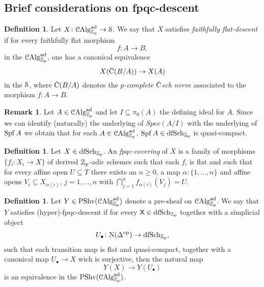 \documentclass[10pt,a4paper]{amsart}
\numberwithin{equation}{subsection}
\theoremstyle{definition}
\newtheorem{remark}[theorem]{Remark}
\newtheorem{definition}[theorem]{Definition}
\begin{document}

\subsection{Brief considerations on fpqc-descent} 

\begin{definition}
    Let $X \colon \mathcal C \mathrm{Alg}^{\mathrm{ad}}_{\mathbb Z_p} \to \mathcal S$. We say that $X$ satisfies \emph{faithfully flat-descent} if for every faithfully flat morphism
        \[
           f \colon  A \to B  ,
        \]
    in the \infcat $\mathcal C \mathrm{Alg}^{\mathrm{ad}}_{\mathbb Z_p}$, one has a canonical equivalence
        \[
            X(\vC(B/A)) \to  X(A) 
        \]
    in the \infcat $\mathcal S$, where $\vC(B/A)$ denotes the \emph{$p$-complete $\vC$ech nerve} associated to the morphism $f \colon A \to B$.
\end{definition}

\begin{remark}
    Let $A \in \mathcal C \mathrm{Alg}^{\mathrm{ad}}_{\mathbb Z_p}$ and let $I \subseteq \pi_0(A)$ the defining ideal for $A$. Since we can identify (naturally) the underlying \inftopos of $Spec (A/I)$
    with the underlying \inftopos of $\operatorname{Spf} A$ we obtain that for each $A \in \mathcal C \mathrm{Alg}^{\mathrm{ad}}_{\mathbb Z_p}$, $\operatorname{Spf} A \in \mathrm{dfSch}_{\mathbb Z_p}$ is quasi-compact.
\end{remark}

\begin{definition}
    Let $X \in \mathrm{dfSch}_{\mathbb Z_p}$. An \emph{fpqc-covering} of $X$ is a family of morphisms $\{ f_i \colon X_i \to X \}$ of derived $\mathbb Z_p$-adic schemes such that each $f_i$ is flat and such that for every affine open $U \subseteq T$ there exists an $n \geq 0$,
    a map $\alpha \colon \{1, \dots, n \}$ and affine opens $V_i \subseteq X_{\alpha(i)}$, $j=1, \dots, n$ with $\bigcap_{j=1}^n f_{\alpha(i)}(V_j) = U$.
\end{definition}

\begin{definition}
    Let $Y \in \mathrm{PShv}(\mathcal C \mathrm{Alg}^{\mathrm{ad}}_{\mathbb Z_p})$ denote a pre-sheaf on $\mathcal C \mathrm{Alg}^{\mathrm{ad}}_{\mathbb Z_p}$. We say that $Y$ satisfies (hyper)-fpqc-descent if for every $\mathsf{X} \in \mathrm{dfSch}_{\mathbb Z_p}$ together with a simplicial object
        \[
            U_\bullet \colon \mathrm{N}(\Delta^{\mathrm{op}}) \to \mathrm{dfSch}_{\mathbb Z_p} , 
        \]
    such that each transition map is flat and quasi-compact,
    together with a canonical map $U_\bullet \to X$ wich is surjective, then the natural map
        \[
                Y(X ) \to Y(U_\bullet)  
        \]
    is an equivalence in the \infcat $\mathrm{PShv}(\mathcal C \mathrm{Alg}^{\mathrm{ad}}_{\mathbb Z_p})$.
\end{definition}
\end{document}
